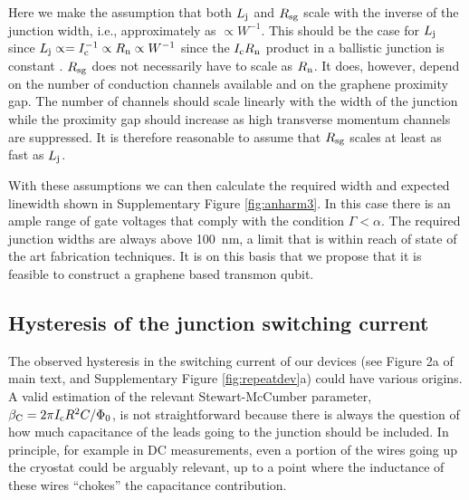 Here we make the assumption that both $L_{\rm j}$ and $R_{\rm sg}$ scale with the inverse of the junction width, i.e., approximately as $\propto W^{-1}$.
This should be the case for $L_{\rm j}$ since $L_{\rm j} \propto = I_{\rm c}^{-1} \propto R_{\rm n} \propto W^{-1}$ since the $I_{\rm c}R_{\rm n}$ product in a ballistic junction is constant \cite{titov_josephson_2006}.
$R_{\rm sg}$ does not necessarily have to scale as $R_{\rm n}$.
It does, however, depend on the number of conduction channels available and on the graphene proximity gap.
The number of channels should scale linearly with the width of the junction while the proximity gap should increase as high transverse momentum channels are suppressed.
It is therefore reasonable to assume that $R_{\rm sg}$ scales at least as fast as $L_{\rm j}$.

With these assumptions we can then calculate the required width and expected linewidth shown in Supplementary Figure \ref{fig:anharm3}.
In this case there is an ample range of gate voltages that comply with the condition $\Gamma<\alpha$.
The required junction widths are always above \SI{100}{nm}, a limit that is within reach of state of the art fabrication techniques.
It is on this basis that we propose that it is feasible to construct a graphene based transmon qubit.




\subsection{Hysteresis of the junction switching current}\label{sec:hysteresis}
\noindent The observed hysteresis in the switching current of our devices (see Figure 2a of main text, and Supplementary Figure \ref{fig:repeatdev}a) could have various origins.
A valid estimation of the relevant Stewart-McCumber parameter\cite{tinkham_introduction_1996}, $\beta_{\rm C}=2\pi I_{\rm c}R^2C/\Phi_0$, is not straightforward because there is always the question of how much capacitance of the leads going to the junction should be included.
In principle, for example in DC measurements, even a portion of the wires going up the cryostat could be arguably relevant, up to a point where the inductance of these wires ``chokes'' the capacitance contribution.

